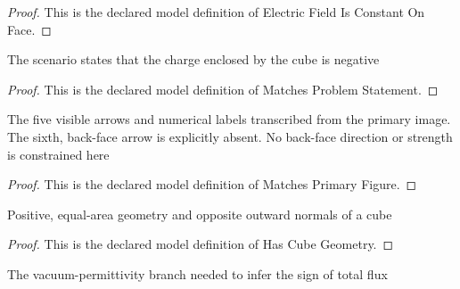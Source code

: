 \begin{proof}
  This is the declared model definition of Electric Field Is Constant On Face.
\end{proof}
\begin{definition}
  \label{def:physics:phyx-mini-0842:phyxminiproblems-problemphyxmini0842-matchesproblemstatement}
  The scenario states that the charge enclosed by the cube is negative
\end{definition}
\begin{proof}
  This is the declared model definition of Matches Problem Statement.
\end{proof}
\begin{definition}
  \label{def:physics:phyx-mini-0842:phyxminiproblems-problemphyxmini0842-matchesprimaryfigure}
  The five visible arrows and numerical labels transcribed from the primary image. The sixth, back-face arrow is explicitly absent. No back-face direction or strength is constrained here
\end{definition}
\begin{proof}
  This is the declared model definition of Matches Primary Figure.
\end{proof}
\begin{definition}
  \label{def:physics:phyx-mini-0842:phyxminiproblems-problemphyxmini0842-hascubegeometry}
  Positive, equal-area geometry and opposite outward normals of a cube
\end{definition}
\begin{proof}
  This is the declared model definition of Has Cube Geometry.
\end{proof}
\begin{definition}
  \label{def:physics:phyx-mini-0842:phyxminiproblems-problemphyxmini0842-hasphysicalvacuumparameters}
  The vacuum-permittivity branch needed to infer the sign of total flux
\end{definition}
